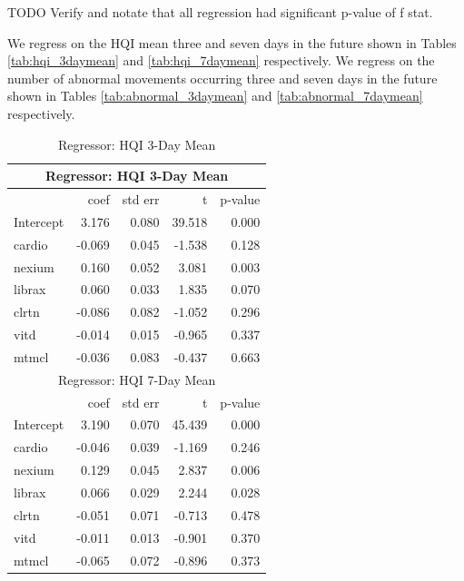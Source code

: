 \documentclass[conference]{IEEEtran}
\begin{document}
TODO Verify and notate that all regression had significant p-value of f stat.

We regress on the HQI mean three and seven days in the future shown in Tables \ref{tab:hqi_3daymean} and \ref{tab:hqi_7daymean} respectively. We regress on the number of abnormal movements occurring three and seven days in the future shown in Tables \ref{tab:abnormal_3daymean} and \ref{tab:abnormal_7daymean} respectively.

\begin{table}
\begin{center}
\caption {Regressor: HQI 3-Day Mean} \label{tab:hqi_mean}
    \begin{tabular}{ | l | r | r | r | r |}
    \hline
    \multicolumn{5}{|c|}{Regressor: HQI 3-Day Mean} \\ \hline
     & coef & std err & t & p-value \\ \hline
Intercept & 3.176 & 0.080 & 39.518 & 0.000 \\
cardio & -0.069 & 0.045 & -1.538 & 0.128 \\
nexium & 0.160 & 0.052 & 3.081 & 0.003 \\
librax & 0.060 & 0.033 & 1.835 & 0.070 \\
clrtn & -0.086 & 0.082 & -1.052 & 0.296 \\
vitd & -0.014 & 0.015 & -0.965 & 0.337 \\
mtmcl & -0.036 & 0.083 & -0.437 & 0.663 \\
    \hline
    \multicolumn{5}{|c|}{Regressor: HQI 7-Day Mean} \\
    \hline
     & coef & std err & t & p-value \\ \hline
Intercept & 3.190 & 0.070 & 45.439 & 0.000 \\
cardio & -0.046 & 0.039 & -1.169 & 0.246 \\
nexium & 0.129 & 0.045 & 2.837 & 0.006 \\
librax & 0.066 & 0.029 & 2.244 & 0.028 \\
clrtn & -0.051 & 0.071 & -0.713 & 0.478 \\
vitd & -0.011 & 0.013 & -0.901 & 0.370 \\
mtmcl & -0.065 & 0.072 & -0.896 & 0.373 \\
    \hline
    \end{tabular}
\end{center}
\end{table}
\end{document}
